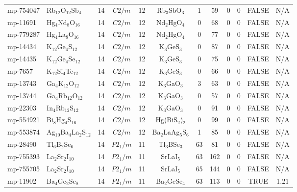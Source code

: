 {\begin{longtable}{llcccccccccc}
    mp-754047 & Rb$_{12}$O$_{12}$Sb$_{4}$ & 14    & $C2/m$ & 12    & Rb$_{3}$SbO$_{3}$ & 1     & 59    & 0     & 0     & FALSE & N/A \\
    mp-11691 & Hg$_{4}$Nd$_{8}$O$_{16}$ & 14    & $C2/m$ & 12    & Nd$_{2}$HgO$_{4}$ & 0     & 68    & 0     & 0     & FALSE & N/A \\
    mp-779287 & Hg$_{4}$La$_{8}$O$_{16}$ & 14    & $C2/m$ & 12    & Nd$_{2}$HgO$_{4}$ & 0     & 77    & 0     & 0     & FALSE & N/A \\
    mp-14434 & K$_{12}$Ge$_{4}$S$_{12}$ & 14    & $C2/m$ & 12    & K$_{3}$GeS$_{3}$ & 0     & 87    & 0     & 0     & FALSE & N/A \\
    mp-14435 & K$_{12}$Ge$_{4}$Se$_{12}$ & 14    & $C2/m$ & 12    & K$_{3}$GeS$_{3}$ & 0     & 75    & 0     & 0     & FALSE & N/A \\
    mp-7657 & K$_{12}$Si$_{4}$Te$_{12}$ & 14    & $C2/m$ & 12    & K$_{3}$GeS$_{3}$ & 0     & 66    & 0     & 0     & FALSE & N/A \\
    mp-13743 & Ga$_{4}$K$_{12}$O$_{12}$ & 14    & $C2/m$ & 12    & K$_{3}$GaO$_{3}$ & 3     & 63    & 0     & 0     & FALSE & N/A \\
    mp-13744 & Ga$_{4}$Rb$_{12}$O$_{12}$ & 14    & $C2/m$ & 12    & K$_{3}$GaO$_{3}$ & 0     & 57    & 0     & 0     & FALSE & N/A \\
    mp-22303 & In$_{4}$Rb$_{12}$S$_{12}$ & 14    & $C2/m$ & 12    & K$_{3}$GaO$_{3}$ & 0     & 91    & 0     & 0     & FALSE & N/A \\
    mp-554921 & Bi$_{8}$Hg$_{4}$S$_{16}$ & 14    & $C2/m$ & 12    & Hg(BiS$_{2}$)$_{2}$ & 0     & 99    & 0     & 0     & FALSE & N/A \\
    mp-553874 & Ag$_{10}$Ba$_{4}$La$_{2}$S$_{12}$ & 14    & $C2/m$ & 12    & Ba$_{2}$LaAg$_{5}$S$_{6}$ & 1     & 85    & 0     & 0     & FALSE & N/A \\
    mp-28490 & Tl$_{6}$B$_{2}$Se$_{6}$ & 14    & $P2_1/m$ & 11    & Tl$_{3}$BSe$_{3}$ & 63    & 81    & 0     & 0     & FALSE & N/A \\
    mp-755393 & La$_{2}$Sr$_{2}$I$_{10}$ & 14    & $P2_1/m$ & 11    & SrLaI$_{5}$ & 63    & 162   & 0     & 0     & FALSE & N/A \\
    mp-755705 & La$_{2}$Sr$_{2}$I$_{10}$ & 14    & $P2_1/m$ & 11    & SrLaI$_{5}$ & 65    & 144   & 0     & 0     & FALSE & N/A \\
    mp-11902 & Ba$_{4}$Ge$_{2}$Se$_{8}$ & 14    & $P2_1/m$ & 11    & Ba$_{2}$GeSe$_{4}$ & 63    & 113   & 0     & 0     & TRUE  & 1.21  \\

\end{longtable}}
